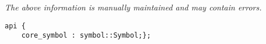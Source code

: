 \label{pkg:core\_symbol}

{\tiny \it The above information is manually maintained and may contain errors.}
\begin{verbatim}
api {
    core_symbol : symbol::Symbol;};
\end{verbatim}
